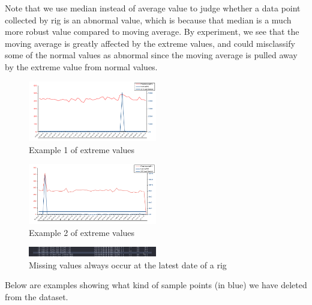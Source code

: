 \documentclass[11pt,twoside]{article}
\numberwithin{Theorem}{section}
\numberwithin{Definition}{section}
\numberwithin{Lemma}{section}
\numberwithin{Algorithm}{section}
\numberwithin{equation}{section}
\begin{document}
Note that we use median instead of average value to judge whether a data point collected by rig is an abnormal value, which is because that median is a much more robust value compared to moving average. By experiment, we see that the moving average is greatly affected by the extreme values, and could misclassify some of the normal values as abnormal since the moving average is pulled away by the extreme value from normal values.

\begin{figure}[!ht]
    \centering
    \includegraphics[width=0.5\textwidth]{p1.png}
    \caption{Example 1 of extreme values}
    \end{figure}

\begin{figure}[!ht]
    \centering
    \includegraphics[width=0.5\textwidth]{p2.png}
    \caption{Example 2 of extreme values}
    \end{figure}

\begin{figure}[!ht]
    \centering
    \includegraphics[width=0.5\textwidth]{p3.png}
    \caption{Missing values always occur at the latest date of a rig}
    \end{figure}

Below are examples showing what kind of sample points (in blue) we have deleted from the dataset.
\end{document}
